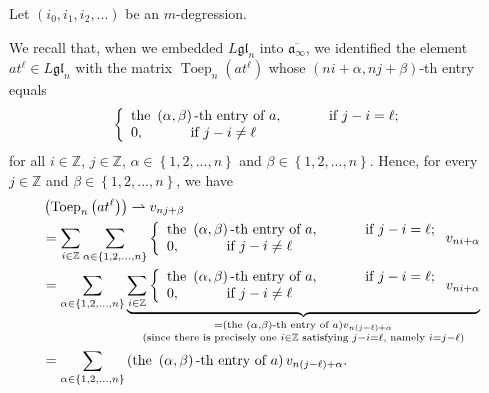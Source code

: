 \documentclass[etingof-lie.tex]{subfiles}
\begin{document}
Let $\left(  i_{0},i_{1},i_{2},...\right)  $ be an $m$-degression.

We recall that, when we embedded $L\mathfrak{gl}_{n}$ into $\overline
{\mathfrak{a}_{\infty}}$, we identified the element $at^{\ell}\in
L\mathfrak{gl}_{n}$ with the matrix $\operatorname*{Toep}\nolimits_{n}\left(
at^{\ell}\right)  $ whose $\left(  ni+\alpha,nj+\beta\right)  $-th entry
equals%
\[
\left\{
\begin{array}
[c]{l}%
\text{the }\left(  \alpha,\beta\right)  \text{-th entry of }%
a,\ \ \ \ \ \ \ \ \ \ \text{if }j-i=\ell;\\
0,\ \ \ \ \ \ \ \ \ \ \text{if }j-i\neq\ell
\end{array}
\right.
\]
for all $i\in\mathbb{Z}$, $j\in\mathbb{Z}$, $\alpha\in\left\{
1,2,...,n\right\}  $ and $\beta\in\left\{  1,2,...,n\right\}  $. Hence, for
every $j\in\mathbb{Z}$ and $\beta\in\left\{  1,2,...,n\right\}  $, we have%
\begin{align}
&  \left(  \operatorname*{Toep}\nolimits_{n}\left(  at^{\ell}\right)  \right)
\rightharpoonup v_{nj+\beta}\nonumber\\
&  =\sum\limits_{i\in\mathbb{Z}}\sum\limits_{\alpha\in\left\{
1,2,...,n\right\}  }\left\{
\begin{array}
[c]{l}%
\text{the }\left(  \alpha,\beta\right)  \text{-th entry of }%
a,\ \ \ \ \ \ \ \ \ \ \text{if }j-i=\ell;\\
0,\ \ \ \ \ \ \ \ \ \ \text{if }j-i\neq\ell
\end{array}
\right.  v_{ni+\alpha}\nonumber\\
&  =\sum\limits_{\alpha\in\left\{  1,2,...,n\right\}  }\underbrace{\sum
\limits_{i\in\mathbb{Z}}\left\{
\begin{array}
[c]{l}%
\text{the }\left(  \alpha,\beta\right)  \text{-th entry of }%
a,\ \ \ \ \ \ \ \ \ \ \text{if }j-i=\ell;\\
0,\ \ \ \ \ \ \ \ \ \ \text{if }j-i\neq\ell
\end{array}
\right.  v_{ni+\alpha}}_{\substack{=\left(  \text{the }\left(  \alpha
,\beta\right)  \text{-th entry of }a\right)  v_{n\left(  j-\ell\right)
+\alpha}\\\text{(since there is precisely one }i\in\mathbb{Z}\text{ satisfying
}j-i=\ell\text{, namely }i=j-\ell\text{)}}}\nonumber\\
&  =\sum\limits_{\alpha\in\left\{  1,2,...,n\right\}  }\left(  \text{the
}\left(  \alpha,\beta\right)  \text{-th entry of }a\right)  v_{n\left(
j-\ell\right)  +\alpha}. \label{pf.glwave.F.3}%
\end{align}
\end{document}
